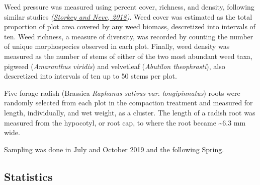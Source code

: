\documentclass[
  12pt,
]{article}
\begin{document}
Weed pressure was measured using percent cover, richness, and density, following similar studies \emph{(\protect\hyperlink{ref-storkey18}{Storkey and Neve, 2018})}.
Weed cover was estimated as the total proportion of plot area covered by any weed biomass, descretized into intervals of ten.
Weed richness, a measure of diversity, was recorded by counting the number of unique morphospecies observed in each plot.
Finally, weed density was measured as the number of stems of either of the two most abundant weed taxa, pigweed (\emph{Amaranthus viridis}) and velvetleaf (\emph{Abutilon theophrasti}), also descretized into intervals of ten up to 50 stems per plot.

Five forage radish (Brassica \emph{Raphanus sativus var. longipinnatus}) roots were randomly selected from each plot in the compaction treatment and measured for length, individually, and wet weight, as a cluster.
The length of a radish root was measured from the hypocotyl, or root cap, to where the root became \textasciitilde6.3 mm
wide.

Sampling was done in July and October 2019 and the following Spring.

\hypertarget{statistics}{%
\subsection{Statistics}\label{statistics}}
\end{document}
